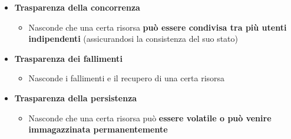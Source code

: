 \documentclass[12pt]{article}
\begin{document}
\begin{itemize}
\begin{itemize}
          \end{itemize}
    \item \textbf{Trasparenza della concorrenza}
          \begin{itemize}
              \item Nasconde che una certa risorsa \textbf{può essere condivisa tra più utenti indipendenti} (assicurandosi la consistenza del suo stato)
          \end{itemize}
    \item \textbf{Trasparenza dei fallimenti}
          \begin{itemize}
              \item Nasconde i fallimenti e il recupero di una certa risorsa
          \end{itemize}
    \item \textbf{Trasparenza della persistenza}
          \begin{itemize}
              \item Nasconde che una certa risorsa può \textbf{essere volatile o può venire immagazzinata permanentemente}
          \end{itemize}
\end{itemize}
\end{document}
